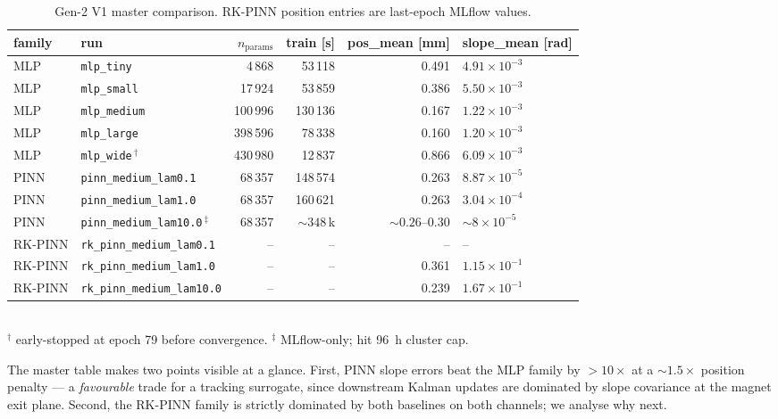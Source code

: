 \documentclass[a4paper,11pt]{article}
\newcommand{\SI}[2]{#1~#2}
\begin{document}
\begin{table}[h]
\centering\small
\caption{Gen-2 V1 master comparison. RK-PINN position entries are
last-epoch MLflow values.}
\label{gen2old:tab:master}
\begin{tabular}{llrrrl}
\toprule
family & run & $n_{\mathrm{params}}$ & train [s]
       & pos\_mean [mm] & slope\_mean [rad]\\
\midrule
MLP     & \texttt{mlp\_tiny}                 & 4\,868   &  53\,118 & 0.491 & $4.91\!\times\!10^{-3}$\\
MLP     & \texttt{mlp\_small}                & 17\,924  &  53\,859 & 0.386 & $5.50\!\times\!10^{-3}$\\
MLP     & \texttt{mlp\_medium}               & 100\,996 & 130\,136 & 0.167 & $1.22\!\times\!10^{-3}$\\
MLP     & \texttt{mlp\_large}                & 398\,596 &  78\,338 & 0.160 & $1.20\!\times\!10^{-3}$\\
MLP     & \texttt{mlp\_wide}\,$^\dagger$     & 430\,980 &  12\,837 & 0.866 & $6.09\!\times\!10^{-3}$\\
PINN    & \texttt{pinn\_medium\_lam0.1}      & 68\,357  & 148\,574 & 0.263 & $8.87\!\times\!10^{-5}$\\
PINN    & \texttt{pinn\_medium\_lam1.0}      & 68\,357  & 160\,621 & 0.263 & $3.04\!\times\!10^{-4}$\\
PINN    & \texttt{pinn\_medium\_lam10.0}\,$^\ddagger$ & 68\,357  & ${\sim}348$\,k & ${\sim}0.26$--$0.30$ & ${\sim}8\!\times\!10^{-5}$\\
RK-PINN & \texttt{rk\_pinn\_medium\_lam0.1}  & --       & --       & --    & --\\
RK-PINN & \texttt{rk\_pinn\_medium\_lam1.0}  & --       & --       & 0.361 & $1.15\!\times\!10^{-1}$\\
RK-PINN & \texttt{rk\_pinn\_medium\_lam10.0} & --       & --       & 0.239 & $1.67\!\times\!10^{-1}$\\
\bottomrule
\end{tabular}
\\[2pt]
{\footnotesize $^\dagger$ early-stopped at epoch 79 before convergence.
$^\ddagger$ MLflow-only; hit \SI{96}{h} cluster cap.}
\end{table}

The master table makes two points visible at a glance. First, PINN slope
errors beat the MLP family by $>\!10\times$ at a $\sim\!1.5\times$ position
penalty --- a \emph{favourable} trade for a tracking surrogate, since
downstream Kalman updates are dominated by slope covariance at the
magnet exit plane. Second, the RK-PINN family is strictly dominated by
both baselines on both channels; we analyse why next.
\end{document}
